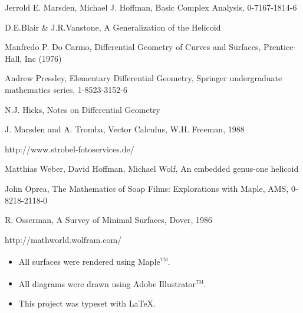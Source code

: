 \begin{thebibliography}{99}

 Jerrold E. Marsden, Michael J. Hoffman, Basic Complex Analysis, 0-7167-1814-6

 D.E.Blair \& J.R.Vanstone, A Generalization of the Helicoid

 Manfredo P. Do Carmo, Differential Geometry of Curves and Surfaces, Prentice-Hall, Inc (1976)

 Andrew Pressley, Elementary Differential Geometry, Springer undergraduate mathematics series, 1-8523-3152-6

 N.J. Hicks, Notes on Differential Geometry 

  J. Marsden and A. Tromba, Vector Calculus, W.H. Freeman, 1988

 http://www.strobel-fotoservices.de/

 Matthias Weber, David Hoffman, Michael Wolf, An embedded genus-one helicoid

 John Oprea, The Mathematics of Soap Films: Explorations with Maple, AMS, 0-8218-2118-0

 R. Osserman, A Survey of Minimal Surfaces, Dover, 1986

 http://mathworld.wolfram.com/

\end{thebibliography}

\begin{itemize}
\item All surfaces were rendered using Maple\textsuperscript{\textsc{tm}}.
\item All diagrams were drawn using Adobe Illustrator\textsuperscript{\textsc{tm}}.
\item This project was typeset with \LaTeX.
\end{itemize}
